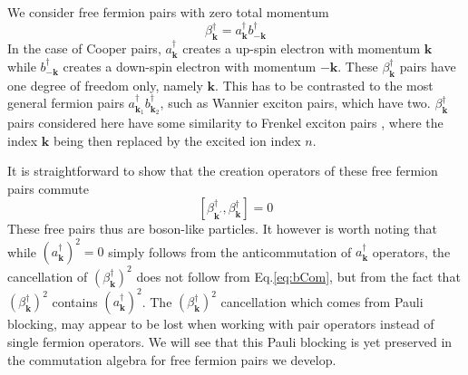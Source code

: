 \documentclass[epj]{svjour}
\newcommand{\vk}{\ensuremath{\mathbf{k}}}
\begin{document}
We consider free fermion pairs with zero total
momentum 
\begin{equation}
\beta^{\dagger}_\vk=a^{\dagger}_{\mathbf{k} }b^{\dagger}_{-\mathbf{k} }
\end{equation}
 In the case of Cooper pairs, $a^{\dagger}_{\mathbf{k} }$ creates a  up-spin electron with momentum $\mathbf{k}$ while $b^{\dagger}_{\mathbf{-k} }$ creates a down-spin electron with momentum $\mathbf{-k}$. These $\beta^{\dagger}_\vk$ pairs have one degree of freedom
only, namely $\mathbf{k}$. This has to be  contrasted to the
most general fermion pairs $a^{\dagger}_{\mathbf{k} _1}b^{\dagger}_{\mathbf{k%
} _2}$, such as Wannier exciton pairs, which have two. $\beta^{\dagger}_\vk$ pairs  considered here have  some similarity to Frenkel exciton pairs \cite{frenkel}, where the index $\mathbf{k}$ being then replaced by the excited ion index $n$. 

It is straightforward to show that the creation operators of these free fermion pairs commute 
\begin{equation}  \label{eq:bCom}
\left[\beta^{\dagger}_{\mathbf{k} ^{\prime}},\beta^{\dagger}_{\mathbf{k} }%
\right]  =0
\end{equation}
These free pairs thus are boson-like  particles.  It however is worth noting that while ${(a^{\dagger}_{\mathbf{k}})} ^2=0$
simply follows from the anticommutation of $a^{\dagger}_{\mathbf{k} }$
operators, the cancellation of ${(\beta^{\dagger}_{\mathbf{k}})} ^2$ does not follow from Eq.\eqref{eq:bCom}, but from the fact that ${(\beta^{\dagger}_{\mathbf{k}})} ^2$  contains ${(a^{\dagger}_{\mathbf{k}})} ^2$. The ${(\beta^{\dagger}_{\mathbf{k}})} ^2$  cancellation which comes from Pauli blocking, may appear  to be lost
when working with pair operators instead of  single fermion operators. We will see that this Pauli blocking is yet preserved in the commutation algebra for
free fermion pairs we develop.
\end{document}

